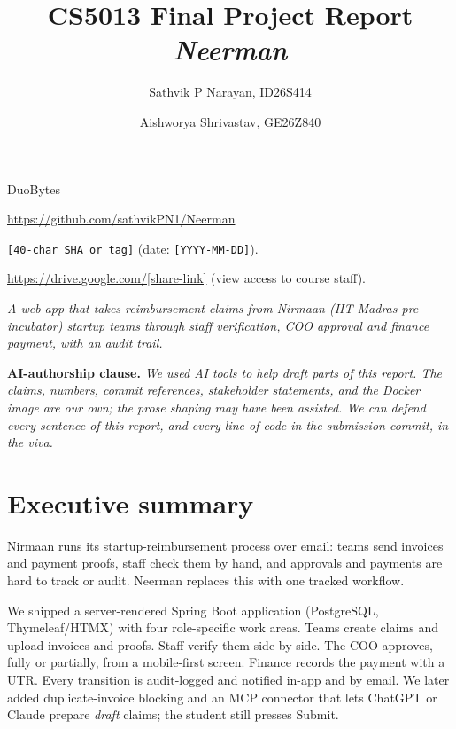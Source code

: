 \documentclass[11pt,a4paper]{article}
\title{
    CS5013 Final Project Report\\
    \large\textit{Neerman}
}
\author{Sathvik P Narayan, ID26S414 \and Aishworya Shrivastav, GE26Z840}
\date{}
\begin{document}
\maketitle
\vspace{-2.0em}

\begin{description}[
    leftmargin=!,
    labelwidth=\widthof{\textbf{Submission commit:}},
    nosep,
    font=\bfseries
]
    \item[Team Name:] DuoBytes
    \item[Repository:] \url{https://github.com/sathvikPN1/Neerman}
    \item[Submission commit:] \texttt{[40-char SHA or tag]} (date: \texttt{[YYYY-MM-DD]}).
    \item[Docker image:] \url{https://drive.google.com/[share-link]} (view access to course staff).
    \item[Tagline:] \textit{A web app that takes reimbursement claims from Nirmaan (IIT Madras pre-incubator) startup teams through staff verification, COO approval and finance payment, with an audit trail.}
\end{description}

\textbf{AI-authorship clause.}
\textit{We used AI tools to help draft parts of this report. The claims,
numbers, commit references, stakeholder statements, and the Docker
image are our own; the prose shaping may have been assisted. We can
defend every sentence of this report, and every line of code in the
submission commit, in the viva.}

\section{Executive summary}

Nirmaan runs its startup-reimbursement process over email: teams send invoices and payment proofs, staff check them by hand, and approvals and payments are hard to track or audit. Neerman replaces this with one tracked workflow.

We shipped a server-rendered Spring Boot application (PostgreSQL, Thymeleaf/HTMX) with four role-specific work areas. Teams create claims and upload invoices and proofs. Staff verify them side by side. The COO approves, fully or partially, from a mobile-first screen. Finance records the payment with a UTR. Every transition is audit-logged and notified in-app and by email. We later added duplicate-invoice blocking and an MCP connector that lets ChatGPT or Claude prepare \emph{draft} claims; the student still presses Submit.
\end{document}
